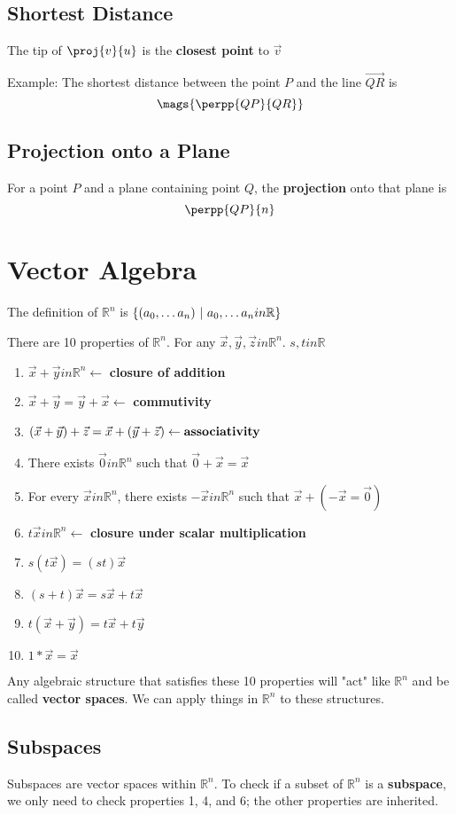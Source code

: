 \documentclass[12pt]{article}
\newcommand{\R}[1]{\mathbb{R}^{#1}}
\begin{document}
\subsection*{Shortest Distance}
The tip of $\proj{v}{u}$ is the {\bf closest point} to $\vec{v}$

Example: The shortest distance between the point $P$ and the line $\vec{QR}$ is \[ \mags{\perpp{QP}{QR}} \]

\subsection*{Projection onto a Plane}
For a point $P$ and a plane containing point $Q$, the {\bf projection} onto that plane is \[ \perpp{QP}{n} \]

\section*{Vector Algebra}
The definition of $\R{n}$ is $\{(a_0,\dots a_n)\ |\  a_0,\dots a_nin\mathbb{R}\}$

There are 10 properties of $\R{n}$. For any $\vec{x}, \vec{y}, \vec{z}in\R{n}$. $s,tin\mathbb{R}$
\begin{enumerate}
\item $\vec{x} + \vec{y}in\R{n} \leftarrow$ {\bf closure of addition}
\item $\vec{x} + \vec{y} = \vec{y} + \vec{x} \leftarrow$ {\bf commutivity}
\item $(\vec{x} + \vec{y}) + \vec{z} = \vec{x} + (\vec{y} + \vec{z}) \leftarrow {\bf associativity}$
\item There exists $\vec{0}in\R{n}$ such that $\vec{0} + \vec{x} = \vec{x}$
\item For every $\vec{x}in\R{n}$, there exists $-\vec{x}in\R{n}$ such that $\vec{x} + (-\vec{x} = \vec{0})$
\item $t\vec{x}in\R{n} \leftarrow$ {\bf closure under scalar multiplication}
\item $s(t\vec{x}) = (st)\vec{x}$
\item $(s+t)\vec{x} = s\vec{x} + t\vec{x}$
\item $t(\vec{x} + \vec{y}) = t\vec{x} + t\vec{y}$
\item $1*\vec{x} = \vec{x}$
\end{enumerate}
Any algebraic structure that satisfies these 10 properties will "act" like $\R{n}$ and be called {\bf vector spaces}. We can apply things in $\R{n}$ to these structures.

\subsection*{Subspaces}
Subspaces are vector spaces within $\R{n}$. To check if a subset of $\R{n}$ is a {\bf subspace}, we only need to check properties 1, 4, and 6; the other properties are inherited.
\end{document}
